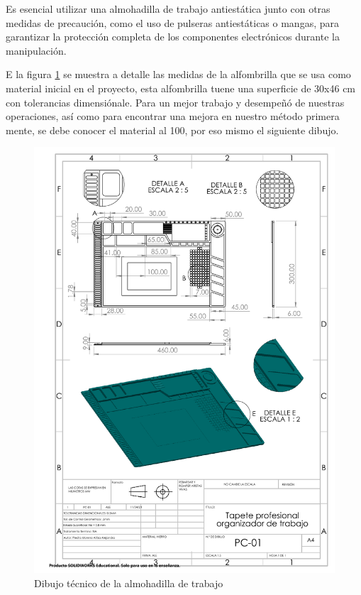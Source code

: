    Es esencial utilizar una almohadilla de trabajo antiestática junto con otras medidas de precaución, como el uso de pulseras antiestáticas o mangas, para garantizar la protección completa de los componentes electrónicos durante la manipulación.
    
    
    E la figura \ref{fig:almohadillaD} se muestra a detalle las medidas de la alfombrilla que se usa como material inicial en el proyecto, esta alfombrilla tuene una superficie de 30x46 cm con tolerancias dimensiónale. Para un mejor trabajo y desempeñó de nuestras operaciones, así como para encontrar una mejora en nuestro método primera mente, se debe conocer el material al 100, por eso mismo el siguiente dibujo.
    
    \begin{figure}[H]
        \centering
        \includegraphics[trim = {20mm 145mm 10mm 42mm},clip,scale=0.4]{22/Img/almohadillaDibujo.pdf}
        \caption{Dibujo técnico de la almohadilla de trabajo}
        \label{fig:almohadillaD}
    \end{figure}
    
